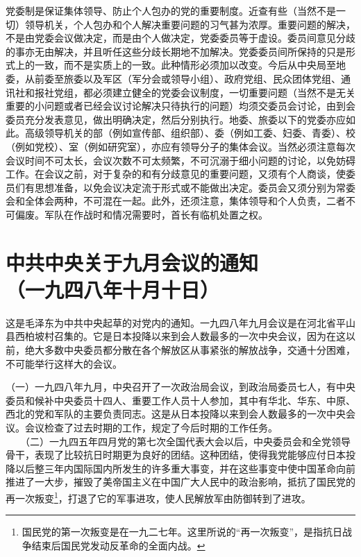 \documentclass[cn,11pt,chinese]{elegantbook}
\def\myformat#1{\hfil\hfil #1}
\begin{document}
党委制是保证集体领导、防止个人包办的党的重要制度。近查有些（当然不是一切）领导机关，个人包办和个人解决重要问题的习气甚为浓厚。重要问题的解决，不是由党委会议做决定，而是由个人做决定，党委委员等于虚设。委员间意见分歧的事亦无由解决，并且听任这些分歧长期地不加解决。党委委员间所保持的只是形式上的一致，而不是实质上的一致。此种情形必须加以改变。今后从中央局至地委，从前委至旅委以及军区（军分会或领导小组）、政府党组、民众团体党组、通讯社和报社党组，都必须建立健全的党委会议制度，一切重要问题（当然不是无关重要的小问题或者已经会议讨论解决只待执行的问题）均须交委员会讨论，由到会委员充分发表意见，做出明确决定，然后分别执行。地委、旅委以下的党委亦应如此。高级领导机关的部（例如宣传部、组织部）、委（例如工委、妇委、青委）、校（例如党校）、室（例如研究室），亦应有领导分子的集体会议。当然必须注意每次会议时间不可太长，会议次数不可太频繁，不可沉溺于细小问题的讨论，以免妨碍工作。在会议之前，对于复杂的和有分歧意见的重要问题，又须有个人商谈，使委员们有思想准备，以免会议决定流于形式或不能做出决定。委员会又须分别为常委会和全体会两种，不可混在一起。此外，还须注意，集体领导和个人负责，二者不可偏废。军队在作战时和情况需要时，首长有临机处置之权。\\
\newpage\section*{\myformat{中共中央关于九月会议的通知}\\\myformat{（一九四八年十月十日）}}
\begin{introduction}\item  这是毛泽东为中共中央起草的对党内的通知。一九四八年九月会议是在河北省平山县西柏坡村召集的。它是日本投降以来到会人数最多的一次中央会议，因为在这以前，绝大多数中央委员都分散在各个解放区从事紧张的解放战争，交通十分困难，不可能举行这样大的会议。\end{introduction}
（一）一九四八年九月，中央召开了一次政治局会议，到政治局委员七人，有中央委员和候补中央委员十四人、重要工作人员十人参加，其中有华北、华东、中原、西北的党和军队的主要负责同志。这是从日本投降以来到会人数最多的一次中央会议。会议检查了过去时期的工作，规定了今后时期的工作任务。\\
　　（二）一九四五年四月党的第七次全国代表大会以后，中央委员会和全党领导骨干，表现了比较抗日时期更为良好的团结。这种团结，使得我党能够应付日本投降以后整三年内国际国内所发生的许多重大事变，并在这些事变中使中国革命向前推进了一大步，摧毁了美帝国主义在中国广大人民中的政治影响，抵抗了国民党的再一次叛变\footnote[1]{ 国民党的第一次叛变是在一九二七年。这里所说的“再一次叛变”，是指抗日战争结束后国民党发动反革命的全面内战。}，打退了它的军事进攻，使人民解放军由防御转到了进攻。\\
\end{document}
